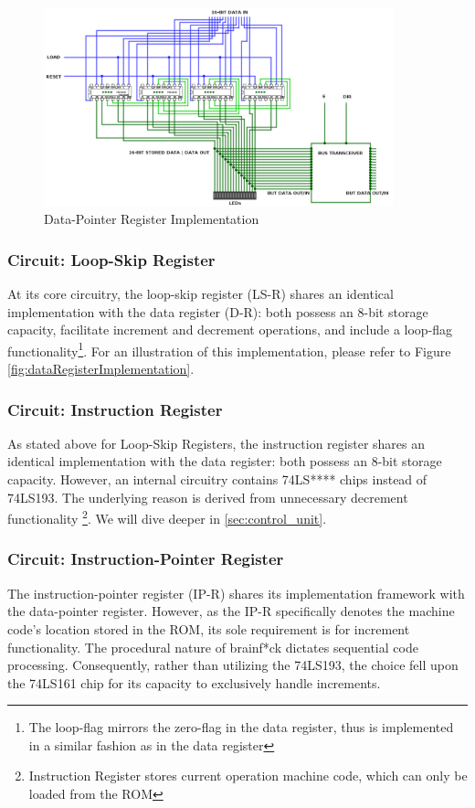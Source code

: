 \begin{figure}[H]
	\centering
	\includegraphics[width=0.9\textwidth]{img/data_pointer_register_implementation}
	\caption{Data-Pointer Register Implementation}
	\label{fig:dataPointerRegisterImplementation}
\end{figure}

\subsubsection{Circuit: Loop-Skip Register} \label{sec:implementation:registers:loop_skip}
At its core circuitry, the loop-skip register (LS-R) shares an identical implementation with the data register (D-R): both possess an 8-bit storage capacity, facilitate increment and decrement operations, and include a loop-flag functionality\footnote{The loop-flag mirrors the zero-flag in the data register, thus is implemented in a similar fashion as in the data register}. For an illustration of this implementation, please refer to Figure \ref{fig:dataRegisterImplementation}.


\subsubsection{Circuit: Instruction Register} \label{sec:implementation:registers:instruction}
As stated above for Loop-Skip Registers, the instruction register shares an identical implementation with the data register: both possess an 8-bit storage capacity. However, an internal circuitry contains 74LS**** chips instead of 74LS193. The underlying reason is derived from unnecessary decrement functionality \footnote{Instruction Register stores current operation machine code, which can only be loaded from the ROM}. We will dive deeper in \ref{sec:control_unit}.

\subsubsection{Circuit: Instruction-Pointer Register}
The instruction-pointer register (IP-R) shares its implementation framework with the data-pointer register. However, as the IP-R specifically denotes the machine code's location stored in the ROM, its sole requirement is for increment functionality. The procedural nature of brainf*ck dictates sequential code processing. Consequently, rather than utilizing the 74LS193, the choice fell upon the 74LS161 chip for its capacity to exclusively handle increments.

